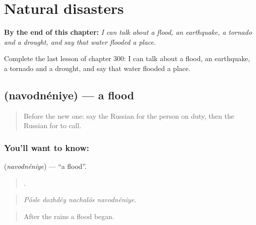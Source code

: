 
\chapter{Natural disasters}
\label{ch:ru-natural-disasters}

\begin{chapteropening}
\textbf{By the end of this chapter:} \emph{I can talk about a flood, an earthquake, a tornado and a drought, and say that water flooded a place.}

Complete the last lesson of chapter 300: I can talk about a flood, an earthquake, a tornado and a drought, and say that water flooded a place.
\end{chapteropening}

\section[\texorpdfstring{\ru{наводнение} (navodnéniye)}{наводнение (navodnéniye)}]{ (navodnéniye) — a flood}

\label{lesson:RU-C300-navodneniye}



\begin{quote}
Before the new one: say the Russian for the person on duty, then the Russian for to call.
\end{quote}

\subsection*{You'll want to know: }
\textbf{} (\emph{navodnéniye}) — \textquotedblleft{}a flood\textquotedblright{}.

\begin{quote}
   .
\end{quote}

\begin{quote}
\emph{Pósle dozhdéy nachalós navodnéniye.}
\end{quote}

\begin{quote}
After the rains a flood began.
\end{quote}

